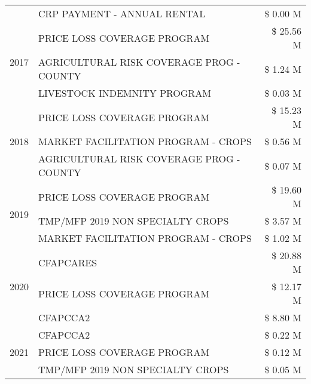 \begin{tabular}{llr}
 & CRP PAYMENT - ANNUAL RENTAL & \$ 0.00 M \\
\cline{1-3}
\multirow[t]{3}{*}{2017} & PRICE LOSS COVERAGE PROGRAM & \$ 25.56 M \\
 & AGRICULTURAL RISK COVERAGE PROG - COUNTY & \$ 1.24 M \\
 & LIVESTOCK INDEMNITY PROGRAM & \$ 0.03 M \\
\cline{1-3}
\multirow[t]{3}{*}{2018} & PRICE LOSS COVERAGE PROGRAM & \$ 15.23 M \\
 & MARKET FACILITATION PROGRAM - CROPS & \$ 0.56 M \\
 & AGRICULTURAL RISK COVERAGE PROG - COUNTY & \$ 0.07 M \\
\cline{1-3}
\multirow[t]{3}{*}{2019} & PRICE LOSS COVERAGE PROGRAM & \$ 19.60 M \\
 & TMP/MFP 2019 NON SPECIALTY CROPS & \$ 3.57 M \\
 & MARKET FACILITATION PROGRAM - CROPS & \$ 1.02 M \\
\cline{1-3}
\multirow[t]{3}{*}{2020} & CFAPCARES & \$ 20.88 M \\
 & PRICE LOSS COVERAGE PROGRAM & \$ 12.17 M \\
 & CFAPCCA2 & \$ 8.80 M \\
\cline{1-3}
\multirow[t]{3}{*}{2021} & CFAPCCA2 & \$ 0.22 M \\
 & PRICE LOSS COVERAGE PROGRAM & \$ 0.12 M \\
 & TMP/MFP 2019 NON SPECIALTY CROPS & \$ 0.05 M \\
\cline{1-3}
\bottomrule
\end{tabular}
